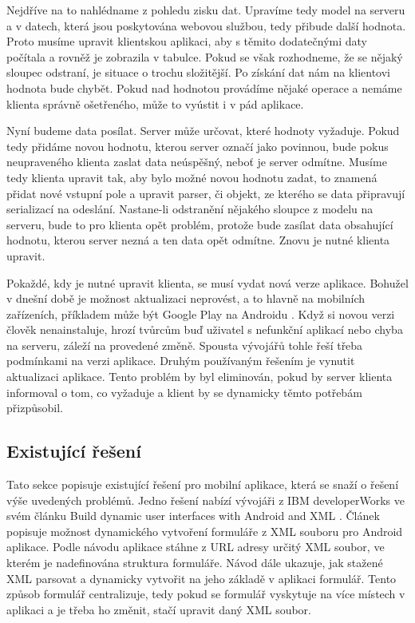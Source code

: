 Nejdříve na to nahlédname z pohledu zisku dat. Upravíme tedy model na serveru a v datech, která jsou poskytována webovou službou, tedy přibude další hodnota. Proto musíme upravit klientskou aplikaci, aby s těmito dodatečnými daty počítala a rovněž je zobrazila v tabulce. Pokud se však rozhodneme, že se nějaký sloupec odstraní, je situace o trochu složitější. Po získání dat nám na klientovi hodnota bude chybět. Pokud nad hodnotou provádíme nějaké operace a nemáme klienta správně ošetřeného, může to vyústit i v pád aplikace.

Nyní budeme data posílat. Server může určovat, které hodnoty vyžaduje. Pokud tedy přidáme novou hodnotu, kterou server označí jako povinnou, bude pokus neupraveného klienta zaslat data neúspěšný, neboť je server odmítne. Musíme tedy klienta upravit tak, aby bylo možné novou hodnotu zadat, to znamená přidat nové vstupní pole a upravit parser, či objekt, ze kterého se data připravují serializací na odeslání. Nastane-li odstranění nějakého sloupce z modelu na serveru, bude to pro klienta opět problém, protože bude zasílat data obsahující hodnotu, kterou server nezná a ten data opět odmítne. Znovu je nutné klienta upravit. 

Pokaždé, kdy je nutné upravit klienta, se musí vydat nová verze aplikace. Bohužel v dnešní době je možnost aktualizaci neprovést, a to hlavně na mobilních zařízeních, příkladem může být Google Play na Androidu \cite{android-auto-update}. Když si novou verzi člověk nenainstaluje, hrozí tvůrcům buď uživatel s nefunkční aplikací nebo chyba na serveru, záleží na provedené změně. Spousta vývojářů tohle řeší třeba podmínkami na verzi aplikace. Druhým používaným řešením je vynutit aktualizaci aplikace. Tento problém by byl eliminován, pokud by server klienta informoval o tom, co vyžaduje a klient by se dynamicky těmto potřebám přizpůsobil.

\subsection{Existující řešení}
Tato sekce popisuje existující řešení pro mobilní aplikace, která se snaží o řešení výše uvedených problémů. Jedno řešení nabízí vývojáři z IBM developerWorks ve svém článku Build dynamic user interfaces with Android and XML \cite{dynamic-android-xml}. Článek popisuje možnost dynamického vytvoření formuláře z XML souboru pro Android aplikace. Podle návodu aplikace stáhne z URL adresy určitý XML soubor, ve kterém je nadefinována struktura formuláře. Návod dále ukazuje, jak stažené XML parsovat a dynamicky vytvořit na jeho základě v aplikaci formulář. Tento způsob formulář centralizuje, tedy pokud se formulář vyskytuje na více místech v aplikaci a je třeba ho změnit, stačí upravit daný XML soubor.

